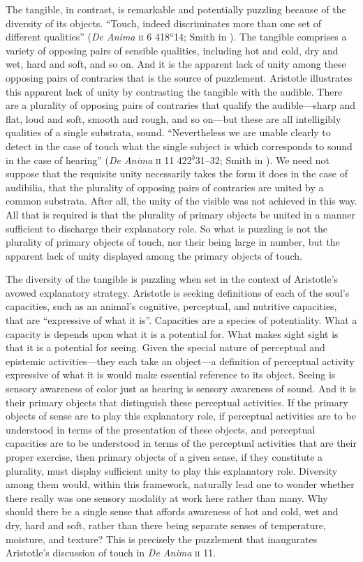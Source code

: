 The tangible, in contrast, is remarkable and potentially puzzling because of the diversity of its objects. ``Touch, indeed discriminates more than one set of different qualities'' (\emph{De Anima} \textsc{ii} 6 418\( ^{a} \)14; Smith in \citealt[32]{Barnes:1984uq}). The tangible comprises a variety of opposing pairs of sensible qualities, including hot and cold, dry and wet, hard and soft, and so on. And it is the apparent lack of unity among these opposing pairs of contraries that is the source of puzzlement. Aristotle illustrates this apparent lack of unity by contrasting the tangible with the audible. There are a plurality of opposing pairs of contraries that qualify the audible---sharp and flat, loud and soft, smooth and rough, and so on---but these are all intelligibly qualities of a single substrata, sound. ``Nevertheless we are unable clearly to detect in the case of touch what the single subject is which corresponds to sound in the case of hearing'' (\emph{De Anima} \textsc{ii} 11 422\( ^{b} \)31--32; Smith in \citealt[40]{Barnes:1984uq}). We need not suppose that the requisite unity necessarily takes the form it does in the case of audibilia, that the plurality of opposing pairs of contraries are united by a common substrata. After all, the unity of the visible was not achieved in this way. All that is required is that the plurality of primary objects be united in a manner sufficient to discharge their explanatory role. So what is puzzling is not the plurality of primary objects of touch, nor their being large in number, but the apparent lack of unity displayed among the primary objects of touch.

The diversity of the tangible is puzzling when set in the context of Aristotle's avowed explanatory strategy. Aristotle is seeking definitions of each of the soul's capacities, such as an animal's cognitive, perceptual, and nutritive capacities, that are ``expressive of what it is''. Capacities are a species of potentiality. What a capacity is depends upon what it is a potential for. What makes sight sight is that it is a potential for seeing. Given the special nature of perceptual and epistemic activities---they each take an object---a definition of perceptual activity expressive of what it is would make essential reference to its object. Seeing is sensory awareness of color just as hearing is sensory awareness of sound. And it is their primary objects that distinguish these perceptual activities. If the primary objects of sense are to play this explanatory role, if perceptual activities are to be understood in terms of the presentation of these objects, and perceptual capacities are to be understood in terms of the perceptual activities that are their proper exercise, then primary objects of a given sense, if they constitute a plurality, must display sufficient unity to play this explanatory role. Diversity among them would, within this framework, naturally lead one to wonder whether there really was one sensory modality at work here rather than many. Why should there be a single sense that affords awareness of hot and cold, wet and dry, hard and soft, rather than there being separate senses of temperature, moisture, and texture? This is precisely the puzzlement that inaugurates Aristotle's discussion of touch in \emph{De Anima} \textsc{ii} 11.

